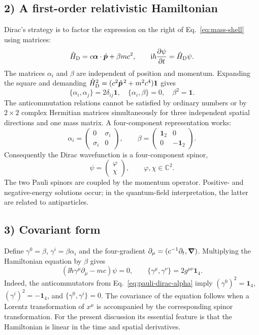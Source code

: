 \subsection*{2) A first-order relativistic Hamiltonian}
Dirac's strategy is to factor the expression on the right of Eq.~\eqref{eq:mass-shell} using matrices:
\begin{equation}
 \hat{H}_{\mathrm D}=c\bm{\alpha}\cdot\hat{\bm{p}}+\beta mc^2,
 \qquad \mathrm{i}\hbar\frac{\partial\psi}{\partial t}=\hat{H}_{\mathrm D}\psi.
\end{equation}
The matrices $\alpha_i$ and $\beta$ are independent of position and momentum. Expanding the square and demanding $\hat{H}_{\mathrm D}^2=(c^2\hat{\bm{p}}^{\,2}+m^2c^4)\mathbf1$ gives
\begin{equation}
 \boxed{\{\alpha_i,\alpha_j\}=2\delta_{ij}\mathbf1,\quad
 \{\alpha_i,\beta\}=0,\quad \beta^2=\mathbf1.}
\end{equation}
The anticommutation relations cannot be satisfied by ordinary numbers or by $2\times2$ complex Hermitian matrices simultaneously for three independent spatial directions and one mass matrix. A four-component representation works:
\begin{equation}\label{eq:pauli-dirac-alpha}
\alpha_i=\begin{pmatrix}0&\sigma_i\\\sigma_i&0\end{pmatrix},\qquad
\beta=\begin{pmatrix}\mathbf1_2&0\\0&-\mathbf1_2\end{pmatrix}.
\end{equation}
Consequently the Dirac wavefunction is a four-component spinor,
\begin{equation}
 \psi=\begin{pmatrix}\varphi\\\chi\end{pmatrix},
 \qquad\varphi,\chi\in\mathbb C^2.
\end{equation}
The two Pauli spinors are coupled by the momentum operator. Positive- and negative-energy solutions occur; in the quantum-field interpretation, the latter are related to antiparticles.

\subsection*{3) Covariant form}
Define $\gamma^0=\beta$, $\gamma^i=\beta\alpha_i$ and the four-gradient
$\partial_\mu=(c^{-1}\partial_t,\bm{\nabla})$. Multiplying the Hamiltonian equation by $\beta$ gives
\begin{equation}\label{eq:dirac-covariant-handout}
\boxed{\left(\ii\hbar\gamma^\mu\partial_\mu-mc\right)\psi=0,\qquad
\{\gamma^\mu,\gamma^\nu\}=2g^{\mu\nu}\mathbf1_4.}
\end{equation}
Indeed, the anticommutators from Eq.~\eqref{eq:pauli-dirac-alpha} imply $(\gamma^0)^2=\mathbf1_4$, $(\gamma^i)^2=-\mathbf1_4$, and $\{\gamma^0,\gamma^i\}=0$. The covariance of the equation follows when a Lorentz transformation of $x^\mu$ is accompanied by the corresponding spinor transformation. For the present discussion its essential feature is that the Hamiltonian is linear in the time and spatial derivatives.

